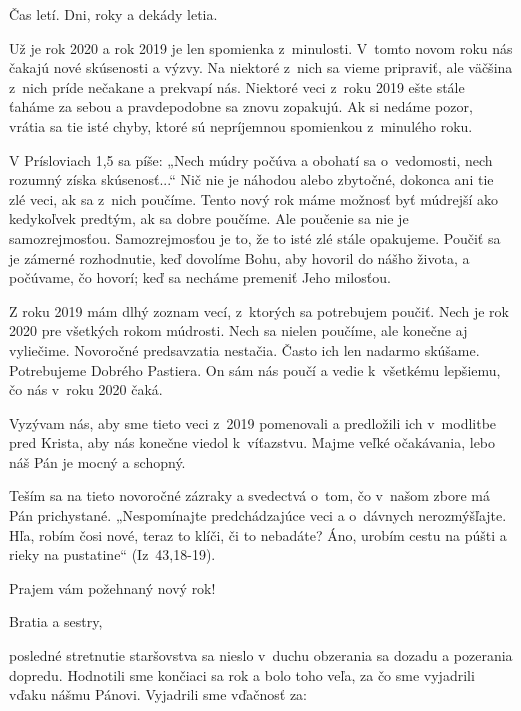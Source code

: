


Čas letí. Dni, roky a dekády letia.

Už je rok 2020 a rok 2019 je len spomienka z~minulosti. V~tomto novom roku nás čakajú nové skúsenosti a výzvy. Na niektoré z~nich sa vieme pripraviť, ale väčšina z~nich príde nečakane a prekvapí nás. Niektoré veci z~roku 2019 ešte stále ťaháme za sebou a pravdepodobne sa znovu zopakujú. Ak si nedáme pozor, vrátia sa tie isté chyby, ktoré sú nepríjemnou spomienkou z~minulého roku.

V Prísloviach 1,5 sa píše: „Nech múdry počúva a obohatí sa o~vedomosti, nech rozumný získa skúsenosť...“ Nič nie je náhodou alebo zbytočné, dokonca ani tie zlé veci, ak sa z~nich poučíme. Tento nový rok máme možnosť byť múdrejší ako kedykoľvek predtým, ak sa dobre poučíme. Ale poučenie sa nie je samozrejmosťou. Samozrejmosťou je to, že to isté zlé stále opakujeme. Poučiť sa je zámerné rozhodnutie, keď dovolíme Bohu, aby hovoril do nášho života, a počúvame, čo hovorí; keď sa necháme premeniť Jeho milosťou.

Z roku 2019 mám dlhý zoznam vecí, z~ktorých sa potrebujem poučiť. Nech je rok 2020 pre všetkých rokom múdrosti. Nech sa nielen poučíme, ale konečne aj vyliečime. Novoročné predsavzatia nestačia. Často ich len nadarmo skúšame. Potrebujeme Dobrého Pastiera. On sám nás poučí a vedie k~všetkému lepšiemu, čo nás v~roku 2020 čaká.

Vyzývam nás, aby sme tieto veci z~2019 pomenovali a predložili ich v~modlitbe pred Krista, aby nás konečne viedol k~víťazstvu. Majme veľké očakávania, lebo náš Pán je mocný a schopný.

Teším sa na tieto novoročné zázraky a svedectvá o~tom, čo v~našom zbore má Pán prichystané. „Nespomínajte predchádzajúce veci a o~dávnych nerozmýšľajte. Hľa, robím čosi nové, teraz to klíči, či to nebadáte? Áno, urobím cestu na púšti a rieky na pustatine“ (Iz~43,18-19).

Prajem vám požehnaný nový rok!



Bratia a sestry,

\nobreak posledné stretnutie staršovstva sa nieslo v~duchu obzerania sa dozadu a pozerania dopredu. Hodnotili sme končiaci sa rok a bolo toho veľa, za čo sme vyjadrili vďaku nášmu Pánovi. Vyjadrili sme vďačnosť za:

